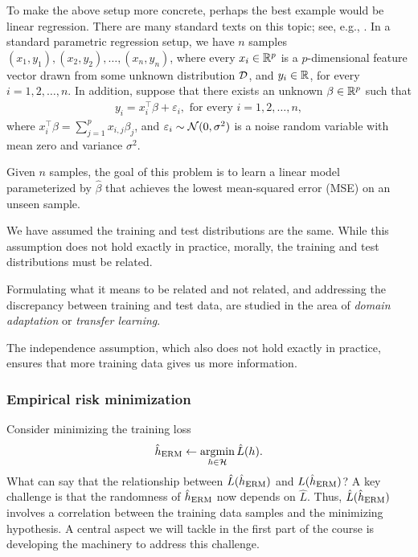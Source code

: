 \begin{example}
    To make the above setup more concrete, perhaps the best example would be linear regression.
    There are many standard texts on this topic; see, e.g., \cite{wainwright2019high}.
    In a standard parametric regression setup, we have $n$ samples $(x_1, y_1), (x_2, y_2), \dots, (x_n, y_n)$, where every $x_i \in \mathbb{R}^p$ is a $p$-dimensional feature vector drawn from some unknown distribution $\mathcal{D}$, and $y_i \in \mathbb{R}$, for every $i = 1, 2, \dots, n$.
    In addition, suppose that there exists an unknown $\beta \in \mathbb{R}^p$ such that
    \begin{align}
        y_i = x_i^{\top} \beta + \varepsilon_i, \text{ for every } i = 1, 2, \dots, n,
    \end{align}
    where $x_i^{\top} \beta = \sum_{j = 1}^p x_{i, j} \beta_j$, and $\varepsilon_i \sim \mathcal{N}(0, \sigma^2)$ is a noise random variable with mean zero and variance $\sigma^2$.

    Given $n$ samples, the goal of this problem is to learn a linear model parameterized by $\hat \beta$ that achieves the lowest mean-squared error (MSE) on an unseen sample.
\end{example}

\begin{remark}
    We have assumed the training and test distributions are the same. While this assumption does not hold exactly in practice, morally, the training and test distributions must be related.
    
    Formulating what it means to be related and not related, and addressing the discrepancy between training and test data, are studied in the area of \emph{domain adaptation} or \emph{transfer learning}.

    The independence assumption, which also does not hold exactly in practice, ensures that more training data gives us more information.
\end{remark}

\subsubsection{Empirical risk minimization}

Consider minimizing the training loss
\begin{align}
    \hat h_{\textup{ERM}} \leftarrow \operatorname*{argmin}_{h \in \mathcal{H}} \hat L(h).
\end{align}
What can say that the relationship between $\hat L(\hat h_{\textup{ERM}})$ and $L(\hat h_{\textup{ERM}})$?
A key challenge is that the randomness of $\hat h_{\textup{ERM}}$ now depends on $\hat L$. Thus, $\hat L(\hat h_{\textup{ERM}})$ involves a correlation between the training data samples and the minimizing hypothesis.
A central aspect we will tackle in the first part of the course is developing the machinery to address this challenge.

